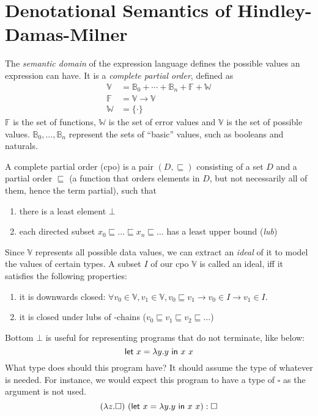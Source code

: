 \appendix
\chapter{Denotational Semantics of Hindley-Damas-Milner}\label{sec:denot-semant-hindl} 

The \emph{semantic domain} of the expression language defines the
possible values an expression can have. It is a \emph{complete partial
  order}, defined as
\begin{align*}
  \mathbb{V} &= \mathbb{B}_0 + \cdots + \mathbb{B}_n + \mathbb{F} + \mathbb{W} \\
  \mathbb{F} &= \mathbb{V} \rightarrow \mathbb{V} \\
  \mathbb{W} &= \{ \cdot \}
\end{align*}
$\mathbb{F}$ is the set of functions, $\mathbb{W}$ is the set of error
values and $\mathbb{V}$ is the set of possible values.
$\mathbb{B}_0 , \ldots , \mathbb{B}_n$ represent the sets of
``basic'' values, such as booleans and naturals.

A complete partial order (cpo) is a pair $(D, \sqsubseteq)$ consisting of a set
$D$ and a partial order $\sqsubseteq$ (a function that orders elements in
$D$, but not necessarily all of them, hence the term partial), such
that
\begin{enumerate}
\item there is a least element $\bot$
\item each directed subset $x_0 \sqsubseteq \ldots \sqsubseteq x_n \sqsubseteq \ldots$ has a least upper bound
  (\emph{lub})
\end{enumerate}

Since $\mathbb{V}$ represents all possible data values, we
can extract an \emph{ideal} of it to model the values of certain
types. A subset $I$ of our cpo $\mathbb{V}$ is called an ideal, iff it
satisfies the following properties:
\begin{enumerate}
\item it is downwards closed: $\forall v_0 \in \mathbb{V}, v_1 \in \mathbb{V}, v_0 \sqsubseteq v_1 \rightarrow
  v_0 \in I \rightarrow v_1 \in I$.
\item it is closed under lubs of \omega-chains ($v_0 \sqsubseteq v_1 \sqsubseteq v_2 \sqsubseteq \ldots$)
\end{enumerate}

Bottom $\bot$ is useful for representing programs that do not terminate,
like below:
\[\mathsf{let} \ x = \lambda y. y \ \mathsf{in} \ x \ x\]
What type does should this program have? It should assume the
type of whatever is needed. For instance, we would expect this program
to have a type of $\square$ as the argument is not used.
\[ (\lambda z. \square) \ (\mathsf{let} \ x = \lambda y. y \ \mathsf{in} \ x \ x) : \square \]


